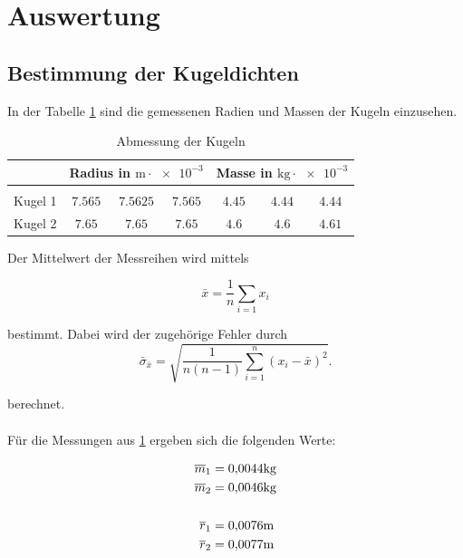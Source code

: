 \section{Auswertung}


\subsection{Bestimmung der Kugeldichten}

In der Tabelle \ref{tab:messwerte_kugel} sind die gemessenen 
Radien und Massen der Kugeln einzusehen.

\begin{table}
\centering
\begin{tabular} {ccccccc}
	\toprule
  & \multicolumn{3}{c}{Radius in $\si{\meter}\cdot \num{e-3}$}  & \multicolumn{3}{c}{Masse in $\si{\kilogram}\cdot \num{e-3}$} \\
\midrule \\
Kugel 1 & $\num{7.565} $&  $\num{7.5625} $ & $\num{7.565} $  & $\num{4.45}$ & $\num{4.44} $ & $\num{4.44} $ \\
Kugel 2  & $\num{7.65} $&  $\num{7.65} $ & $\num{7.65} $ & $\num{4.6}$ & $\num{4.6} $ & $\num{4.61} $ \\
\bottomrule
\end{tabular}
\caption{Abmessung der Kugeln}
\label{tab:messwerte_kugel}
\end{table}

Der Mittelwert der Messreihen wird mittels

\begin{equation}
\label{eq:mittel}
\bar{x}=\frac{1}{n}\sum_{i=1}x_i
\end{equation}

bestimmt. Dabei wird der zugehörige Fehler
durch 
\begin{equation}
\label{eq:stand_ab}
\bar{\sigma}_{\bar{x}}=\sqrt{\frac{1}{n(n-1)}\sum_{i=1}^{n}(x_i-\bar{x})^2}.
\end{equation}

berechnet.
\\ \hfill
\\
\hfill
Für die Messungen aus \ref{tab:messwerte_kugel} ergeben sich die
folgenden Werte:

\begin{align}
\label{eq:abmessungen_kugel}
\begin{aligned}
\overline{m}_{1}&=  \num{0.0044}\si{\kilogram} \\
\overline{m}_{2}&= \num{0.0046} \si{\kilogram} \\
\hfill \\
\overline{r}_{1}&= \num{0.0076}\si{\meter} \\
\overline{r}_{2}&= \num{0.0077} \si{\meter} \\
\end{aligned}
\end{align}

